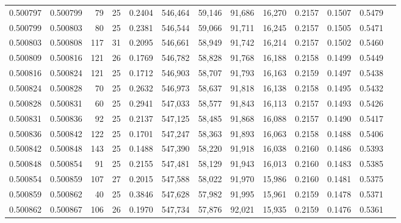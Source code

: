 \begin{tabular}{rrrrrrrrrrrrr}
0.500797 & 0.500799 &  79 &  25 &                                     0.2404 & 546,464 &  59,146 &  91,686 &  16,270 & 0.2157 & 0.1507 & 0.5479 \\
0.500799 & 0.500803 &  80 &  25 &                                     0.2381 & 546,544 &  59,066 &  91,711 &  16,245 & 0.2157 & 0.1505 & 0.5471 \\
0.500803 & 0.500808 & 117 &  31 &                                     0.2095 & 546,661 &  58,949 &  91,742 &  16,214 & 0.2157 & 0.1502 & 0.5460 \\
0.500809 & 0.500816 & 121 &  26 &                                     0.1769 & 546,782 &  58,828 &  91,768 &  16,188 & 0.2158 & 0.1499 & 0.5449 \\
0.500816 & 0.500824 & 121 &  25 &                                     0.1712 & 546,903 &  58,707 &  91,793 &  16,163 & 0.2159 & 0.1497 & 0.5438 \\
0.500824 & 0.500828 &  70 &  25 &                                     0.2632 & 546,973 &  58,637 &  91,818 &  16,138 & 0.2158 & 0.1495 & 0.5432 \\
0.500828 & 0.500831 &  60 &  25 &                                     0.2941 & 547,033 &  58,577 &  91,843 &  16,113 & 0.2157 & 0.1493 & 0.5426 \\
0.500831 & 0.500836 &  92 &  25 &                                     0.2137 & 547,125 &  58,485 &  91,868 &  16,088 & 0.2157 & 0.1490 & 0.5417 \\
0.500836 & 0.500842 & 122 &  25 &                                     0.1701 & 547,247 &  58,363 &  91,893 &  16,063 & 0.2158 & 0.1488 & 0.5406 \\
0.500842 & 0.500848 & 143 &  25 &                                     0.1488 & 547,390 &  58,220 &  91,918 &  16,038 & 0.2160 & 0.1486 & 0.5393 \\
0.500848 & 0.500854 &  91 &  25 &                                     0.2155 & 547,481 &  58,129 &  91,943 &  16,013 & 0.2160 & 0.1483 & 0.5385 \\
0.500854 & 0.500859 & 107 &  27 &                                     0.2015 & 547,588 &  58,022 &  91,970 &  15,986 & 0.2160 & 0.1481 & 0.5375 \\
0.500859 & 0.500862 &  40 &  25 &                                     0.3846 & 547,628 &  57,982 &  91,995 &  15,961 & 0.2159 & 0.1478 & 0.5371 \\
0.500862 & 0.500867 & 106 &  26 &                                     0.1970 & 547,734 &  57,876 &  92,021 &  15,935 & 0.2159 & 0.1476 & 0.5361 \\

\end{tabular}
